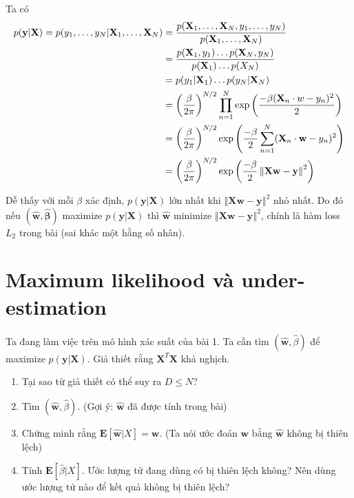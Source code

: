 \documentclass{article}
\let\mb\mathbf
\let\eop\qedsymbol
\begin{document}
Ta có
\begin{align}
p(\mb y | \mb X) = p(y_1, \ldots, y_N | \mb X_1, \ldots, \mb X_N) &= \frac{p(\mb X_1, \ldots, \mb X_N, y_1, \ldots, y_N)}{p(\mb X_1, \ldots, \mb X_N)} \nonumber \\
&= \frac{p(\mb X_1, y_1) \ldots p(\mb X_N, y_N)}{p(\mb X_1) \ldots p(\mb \mb X_N)} \nonumber \\
&= p(y_1|\mb X_1)\ldots p(y_N|\mb X_N) \nonumber \\
&= \left( \frac\beta{2\pi}\right)^{N/2} \prod_{n=1}^N \exp\left( \frac{- \beta (\mb X_n \cdot w - y_n)^2}{2} \right) \nonumber \\
&= \left( \frac\beta{2\pi}\right)^{N/2} \exp\left(\frac{- \beta  }{2} \sum_{n=1}^N (\mb X_n \cdot \mb w - y_n)^2 \right)  \nonumber \\
&= \left( \frac\beta{2\pi}\right)^{N/2} \exp\left(\frac{- \beta  }{2} \left\Vert \mb X \mb w - \mb y \right\Vert^2 \right)
\end{align}

Dễ thấy với mỗi $\beta$ xác định, $p(\mb y | \mb X)$ lớn nhất khi 
$ \left\Vert \mb X \mb w - \mb y \right\Vert^2 $ nhỏ nhất. Do đó nếu $(\hat{ \mb w}, \hat {\mb \beta})$ maximize $p(\mb y | \mb X)$ thì $\hat{ \mb w}$ minimize $ \left\Vert \mb X \mb w - \mb y \right\Vert^2 $, chính là hàm loss $L_2$ trong bài (sai khác một hằng số nhân). \eop

\section{Maximum likelihood và under-estimation}
Ta đang làm việc trên mô hình xác suất của bài 1. Ta cần tìm $(\hat{\mb w}, \hat \beta)$ để maximize $p(\mb y | \mb X)$. Giả thiết rằng $\mb X^T \mb X$ khả nghịch.
\begin{enumerate}
    \item Tại sao từ giả thiết có thể suy ra $D \leq N$?
    \item Tìm $(\hat{\mb w}, \hat \beta)$. (Gợi ý: $\hat {\mb w}$ đã được tính trong bài)
    \item Chứng minh rằng $\mb E[\hat{\mb w} | X] = \mb w$. (Ta nói ước đoán $\mb w$ bằng $\hat {\mb w}$ không bị thiên lệch)
    \item Tính $\mb E[\hat{\beta} | X]$. Ước lượng tử đang dùng có bị thiên lệch không? Nên dùng ước lượng tử nào để kết quả không bị thiên lệch?
\end{enumerate}
\end{document}

